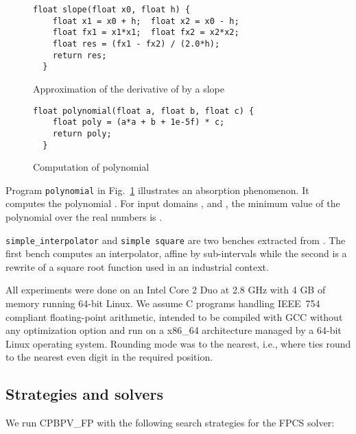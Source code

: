 \documentclass[a4paper]{llncs}
\newcommand{\olivier}[2]{\ifempty{#1}{\textcolor{black}{#2}}{(\sout{#1}) \textcolor{red}{#2}}}
\newcommand{\IEEESTD}{\textsc{IEEE}~754}
\newcommand{\FPCS}{\textsc{FPCS}}
\newcommand{\OUR}{\textsc{CPBPV\_FP}}
\begin{document}
\begin{figure}[t]
\begin{lstlisting}[numbersep=-1em,numberstyle=\tiny]
  float slope(float x0, float h) { 
    float x1 = x0 + h;  float x2 = x0 - h;
    float fx1 = x1*x1;  float fx2 = x2*x2;
    float res = (fx1 - fx2) / (2.0*h);
    return res;
  }
\end{lstlisting}
\caption{Approximation of the derivative of  by a slope}
\label{lst:derivative}

\begin{lstlisting}[numbersep=-1em,numberstyle=\tiny]
  float polynomial(float a, float b, float c) { 
    float poly = (a*a + b + 1e-5f) * c;
    return poly;
  }
\end{lstlisting}
\caption{Computation of polynomial }
\label{lst:polynomial}
\end{figure}


Program {\tt polynomial} in Fig.~\ref{lst:polynomial} illustrates an
absorption phenomenon. It computes the
polynomial . For input domains , 
and , the minimum value of the polynomial
over the real numbers is \olivier{}{equal to} . 


 {\tt simple\_interpolator} and {\tt simple square} are two benches extracted from \cite{GoubaultP13}.
The first bench  computes an interpolator, affine by sub-intervals while the second is a rewrite of a square root function
used in an industrial context.


All experiments were done on an Intel Core 2
  Duo at 2.8 GHz with 4 GB of memory running 64-bit Linux.
We assume C programs handling \IEEESTD{} compliant floating-point arithmetic,
intended to be compiled with GCC without any optimization option and
run on a x86\_64 architecture managed by a 64-bit Linux operating
system. Rounding mode was to the nearest, i.e.,  where ties round to the nearest even digit in the required position.


\subsection{Strategies and solvers}

We run \OUR{} with the following search strategies for the \FPCS{} solver:
\end{document}
